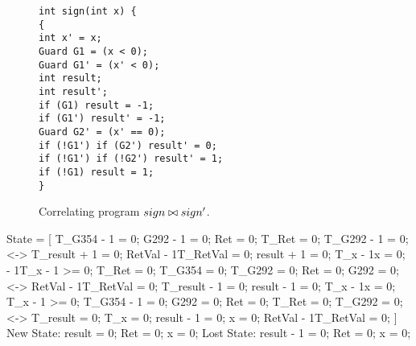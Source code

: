 \begin{figure}
\centering
\begin{lstlisting}
int sign(int x) {
{
int x' = x;
Guard G1 = (x < 0);
Guard G1' = (x' < 0);
int result;
int result';
if (G1) result = -1;
if (G1') result' = -1;
Guard G2' = (x' == 0);
if (!G1') if (G2') result' = 0;
if (!G1') if (!G2') result' = 1;
if (!G1) result = 1;
}
\end{lstlisting}
\caption{Correlating program $sign \bowtie sign'$.}
\end{figure}

State = [
{ T_G354 - 1 = 0; G292 - 1 = 0; Ret = 0; T_Ret = 0; T_G292 - 1 = 0; } <-> { T_result + 1 = 0; RetVal - 1T_RetVal = 0; result + 1 = 0; T_x - 1x = 0; - 1T_x - 1 >= 0; }
{ T_Ret = 0; T_G354 = 0; T_G292 = 0; Ret = 0; G292 = 0; } <-> { RetVal - 1T_RetVal = 0; T_result - 1 = 0; result - 1 = 0; T_x - 1x = 0; T_x - 1 >= 0; }
{ T_G354 - 1 = 0; G292 = 0; Ret = 0; T_Ret = 0; T_G292 = 0; } <-> { T_result = 0; T_x = 0; result - 1 = 0; x = 0; RetVal - 1T_RetVal = 0; }
]
New State: { result = 0; Ret = 0; x = 0; }
Lost State: { result - 1 = 0; Ret = 0; x = 0; }

